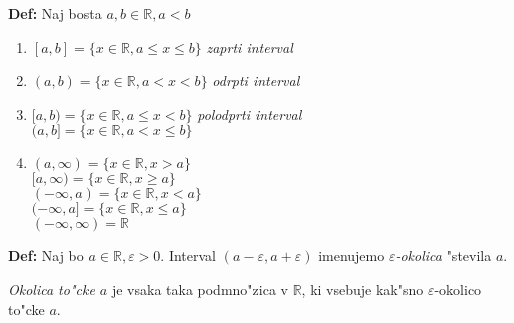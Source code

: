\textbf{Def:} Naj bosta $a, b \in \mathbb{R}, a < b$
\begin{enumerate}
	\item $[a,b] = \{x \in \mathbb{R}, a \leq x \leq b\}$  \emph{zaprti interval}
	\item $(a, b) = \{x \in \mathbb{R}, a < x < b\}$ \emph{odrpti interval}
	\item $[a, b) = \{x \in \mathbb{R}, a \leq x < b\}$ \emph{polodprti interval}\\
	$(a, b] = \{x \in \mathbb{R}, a < x \leq b\}$
	\item $(a, \infty) = \{x \in \mathbb{R}, x > a\}$\\
	$[a, \infty) = \{x \in \mathbb{R}, x \geq a\}$\\
	$(-\infty, a) = \{x \in \mathbb{R}, x < a\}$\\
	$(-\infty, a] = \{x \in \mathbb{R}, x \leq a\}$\\
	$(-\infty, \infty) = \mathbb{R}$
\end{enumerate}

\textbf{Def:} Naj bo $a \in \mathbb{R}, \varepsilon > 0$. Interval $(a-\varepsilon, a + \varepsilon)$ imenujemo \emph{$\varepsilon$-okolica} "stevila $a$.

\emph{Okolica to"cke $a$} je vsaka taka podmno"zica v $\mathbb{R}$, ki vsebuje kak"sno $\varepsilon$-okolico to"cke $a$.